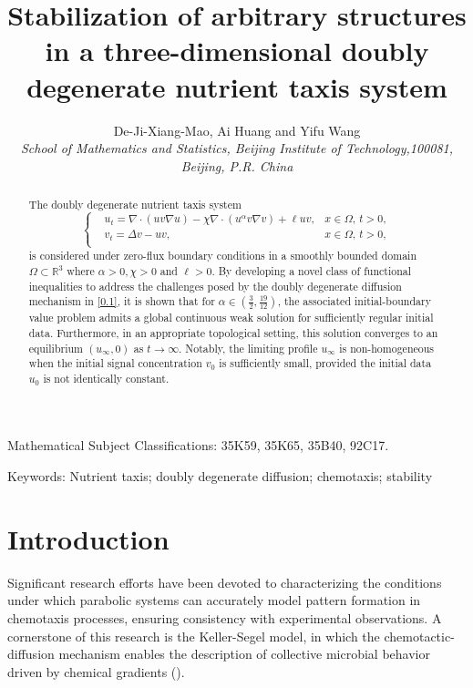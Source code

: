 \documentclass[12pt]{article}
\theoremstyle{plain}
\theoremstyle{definition}
\numberwithin{equation}{section}
\begin{document}
\allowdisplaybreaks
\title{\large\bf Stabilization of arbitrary structures in a  three-dimensional doubly degenerate nutrient taxis system}
\author{
{\rm De-Ji-Xiang-Mao, Ai Huang and Yifu Wang}\\
{\it\small  School of Mathematics and Statistics,
 Beijing Institute of Technology,100081, Beijing, P.R. China}
}

\date{}
\maketitle
\begin{abstract}
The doubly degenerate nutrient taxis system
\begin{equation}\label {0.1}
\left\{
\begin{aligned}
&u_{t}=\nabla \cdot (uv\nabla u)-\chi \nabla \cdot (u^{\alpha}v\nabla v)+\ell uv,&x\in \Omega,\, t>0,\\
& v_{t}=\Delta v-uv,&x\in \Omega,\, t>0,\\
\end{aligned}
\right.
\end{equation}
is considered under zero-flux boundary conditions in a smoothly bounded domain $\Omega\subset\mathbb{R}^3$ where $\alpha>0,\chi>0$ and $\ell> 0$. By developing a novel class of functional inequalities to address the challenges posed by
   the doubly degenerate diffusion mechanism in \eqref{0.1}, it is shown that for $\alpha\in(\frac{3}{2},\frac{19}{12})$, the associated initial-boundary value problem admits a global continuous  weak solution for sufficiently regular initial data.
Furthermore, in an appropriate topological setting, this solution converges to an equilibrium $(u_\infty, 0)$ as $t\rightarrow \infty$. Notably, the limiting  profile $u_{\infty}$ is  non-homogeneous when the initial signal concentration $v_0$ is sufficiently small, provided the initial data $u_0$ is not identically constant.
\end{abstract}

\vskip1mm
{\small {Mathematical Subject Classifications}: 35K59, 35K65, 35B40, 92C17.

{Keywords}: Nutrient taxis; doubly degenerate diffusion; chemotaxis; stability}

\vskip2mm

\section{Introduction}\label{Intro}
Significant research efforts have been devoted to characterizing the conditions under which parabolic systems can accurately model pattern formation in chemotaxis processes, ensuring consistency with experimental observations. A cornerstone of this research is the Keller-Segel model, in which the chemotactic-diffusion mechanism enables the description of collective microbial behavior driven by chemical gradients (\cite{KS,B,Ni}).
\end{document}
